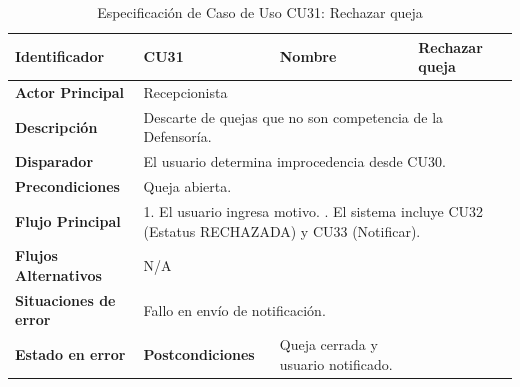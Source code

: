 \begingroup
\setlength{\parskip}{0pt}
\begin{longtable}{|p{3.5cm}|p{2cm}|p{2.5cm}|p{7cm}|}
\caption{Especificación de Caso de Uso CU31: Rechazar queja}
\label{tab:cu31} \\
\hline
\textbf{Identificador} & CU31 & \textbf{Nombre} & Rechazar queja \\ \hline
\textbf{Actor Principal} & \multicolumn{3}{p{11.5cm}|}{Recepcionista} \\ \hline
\textbf{Descripción} & \multicolumn{3}{p{11.5cm}|}{Descarte de quejas que no son competencia de la Defensoría.} \\ \hline
\textbf{Disparador} & \multicolumn{3}{p{11.5cm}|}{El usuario determina improcedencia desde CU30.} \\ \hline
\textbf{Precondiciones} & \multicolumn{3}{p{11.5cm}|}{Queja abierta.} \\ \hline
\textbf{Flujo Principal} & \multicolumn{3}{p{11.5cm}|}{1. El usuario ingresa motivo. \newline 2. El sistema incluye CU32 (Estatus RECHAZADA) y CU33 (Notificar).} \\ \hline
\textbf{Flujos Alternativos} & \multicolumn{3}{p{11.5cm}|}{N/A} \\ \hline
\textbf{Situaciones de error} & \multicolumn{3}{p{11.5cm}|}{Fallo en envío de notificación.} \\ \hline
\textbf{Estado en error} & \textbf{Postcondiciones} & Queja cerrada y usuario notificado. \\ \hline
\end{longtable}
\endgroup

\vspace{0.8cm}

